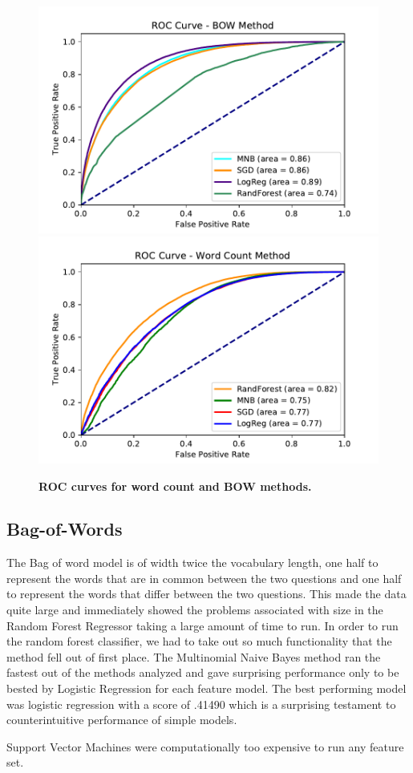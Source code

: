 \documentclass{article} %
\begin{document}
\begin{figure}[]
	\centering
	\includegraphics[width=.49\textwidth]{roc}
	\includegraphics[width=.49\textwidth]{roc_wc}
	\caption{\textbf{ROC curves for word count and BOW methods.}}
	\label{fig:roc_wc}
\end{figure}

\subsection{Bag-of-Words} \label{sub:bow_res}

The Bag of word model is of width twice the vocabulary length, one half to represent the words that are in common between the two questions and one half to represent the words that differ between the two questions. This made the data quite large and immediately showed the problems associated with size in the Random Forest Regressor taking a large amount of time to run. In order to run the random forest classifier, we had to take out so much functionality that the method fell out of first place. The Multinomial Naive Bayes method ran the fastest out of the methods analyzed and gave surprising performance only to be bested by Logistic Regression for each feature model. The best performing model was logistic regression with a score of .41490 which is a surprising testament to counterintuitive performance of simple models.

Support Vector Machines were computationally too expensive to run any feature set.
\end{document}
